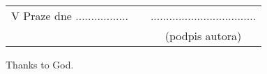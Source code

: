 \newcommand{\odsaditodzhora}{\hskip1pt\vfill}

\odsaditodzhora
{}

 \baselineskip




\begin{flushleft}
\begin{tabular}{cp{}c}
V Praze dne .................
& 
&
..................................
\\
&&
(podpis autora)
\end{tabular}

\end{flushleft}
\newpage

\odsaditodzhora
{}

 \baselineskip

Thanks to God.
\newpage
